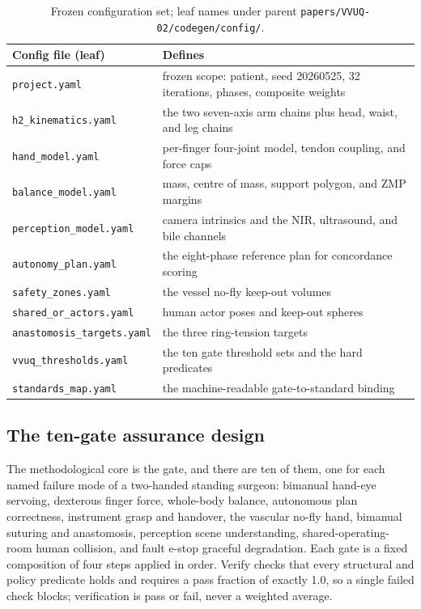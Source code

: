 \begin{table}[H]
\caption{Frozen configuration set; leaf names under parent
\texttt{papers/VVUQ-02/codegen/config/}.}
\label{tab:config}
\centering
\footnotesize
\begin{tabularx}{\textwidth}{L{4cm} Y}
\toprule
\textbf{Config file (leaf)} & \textbf{Defines} \\
\midrule
\texttt{project.yaml} & frozen scope: patient, seed 20260525, 32 iterations, phases, composite weights \\
\texttt{h2\_kinematics.yaml} & the two seven-axis arm chains plus head, waist, and leg chains \\
\texttt{hand\_model.yaml} & per-finger four-joint model, tendon coupling, and force caps \\
\texttt{balance\_model.yaml} & mass, centre of mass, support polygon, and ZMP margins \\
\texttt{perception\_model.yaml} & camera intrinsics and the NIR, ultrasound, and bile channels \\
\texttt{autonomy\_plan.yaml} & the eight-phase reference plan for concordance scoring \\
\texttt{safety\_zones.yaml} & the vessel no-fly keep-out volumes \\
\texttt{shared\_or\_actors.yaml} & human actor poses and keep-out spheres \\
\texttt{anastomosis\_targets.yaml} & the three ring-tension targets \\
\texttt{vvuq\_thresholds.yaml} & the ten gate threshold sets and the hard predicates \\
\texttt{standards\_map.yaml} & the machine-readable gate-to-standard binding \\
\bottomrule
\end{tabularx}
\end{table}

\clearpage

\subsection{The ten-gate assurance design}

The methodological core is the gate, and there are ten of them, one for each
named failure mode of a two-handed standing surgeon: bimanual hand-eye servoing,
dexterous finger force, whole-body balance, autonomous plan correctness,
instrument grasp and handover, the vascular no-fly hand, bimanual suturing and
anastomosis, perception scene understanding, shared-operating-room human
collision, and fault e-stop graceful degradation. Each gate is a fixed
composition of four steps applied in order. Verify checks that every structural
and policy predicate holds and requires a pass fraction of exactly 1.0, so a
single failed check blocks; verification is pass or fail, never a weighted
average. 

